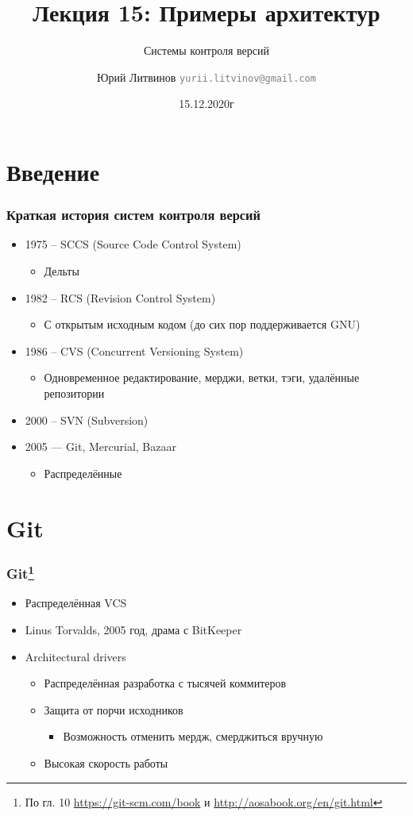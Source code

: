\documentclass[xetex,mathserif,serif]{beamer}
\title{Лекция 15: Примеры архитектур}
\subtitle{Системы контроля версий}
\author[Юрий Литвинов]{Юрий Литвинов \newline \textcolor{gray}{\small\texttt{yurii.litvinov@gmail.com}}}
\date{15.12.2020г}
\begin{document}
	
	\frame{\titlepage}

	\section{Введение}

	\begin{frame}
		\frametitle{Краткая история систем контроля версий}
		\begin{itemize}
			\item 1975 -- SCCS (Source Code Control System)
			\begin{itemize}
				\item Дельты
			\end{itemize}
			\item 1982 -- RCS (Revision Control System)
			\begin{itemize}
				\item С открытым исходным кодом (до сих пор поддерживается GNU)
			\end{itemize}
			\item 1986 -- CVS (Concurrent Versioning System)
			\begin{itemize}
				\item Одновременное редактирование, мерджи, ветки, тэги, удалённые репозитории
			\end{itemize}
			\item 2000 -- SVN (Subversion)
			\item 2005 --- Git, Mercurial, Bazaar
			\begin{itemize}
				\item Распределённые
			\end{itemize}
		\end{itemize}
	\end{frame}

	\section{Git}

	\begin{frame}
		\frametitle{Git\footnote{\tiny{По гл. 10 \url{https://git-scm.com/book} и \url{http://aosabook.org/en/git.html}}}}
		\begin{itemize}
			\item Распределённая VCS
			\item Linus Torvalds, 2005 год, драма с BitKeeper
			\item Architectural drivers
			\begin{itemize}
				\item Распределённая разработка с тысячей коммитеров
				\item Защита от порчи исходников
				\begin{itemize}
					\item Возможность отменить мердж, смерджиться вручную
				\end{itemize}
				\item Высокая скорость работы
			\end{itemize}
		\end{itemize}
	\end{frame}
\end{document}
